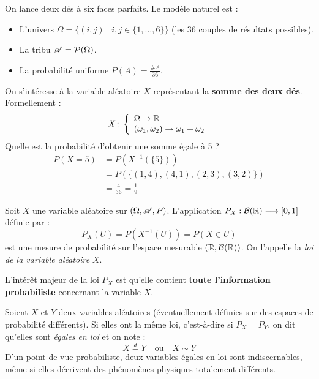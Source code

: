 \begin{exemple}
    On lance deux dés à six faces parfaits. Le modèle naturel est :
    \begin{itemize}
        \item L'univers $\Omega = \{(i,j) \mid i,j \in \{1,\dotsc,6\}\}$ (les 36 couples de résultats possibles).
        \item La tribu $\mathscr{A} = \mathcal{P}(\Omega)$.
        \item La probabilité uniforme $P(A) = \frac{\#A}{36}$.
    \end{itemize}
    On s'intéresse à la variable aléatoire $X$ représentant la \textbf{somme des deux dés}. Formellement :
    \[
    X\colon \left\{\begin{array}{l}\Omega\to\mathbb{R} \\(\omega_1, \omega_2) \to \omega_1 + \omega_2\end{array}\right.
    \]
    Quelle est la probabilité d'obtenir une somme égale à 5 ?
    \begin{align*}
        P(X = 5) &= P\!\left(X^{-1}(\{5\})\right) \\
        &= P\!\left(\{(1,4), (4,1), (2,3), (3,2)\}\right) \\
        &= \frac{4}{36} = \frac{1}{9}
    \end{align*}
\end{exemple}

\begin{definition}
    Soit $X$ une variable aléatoire sur $(\Omega, \mathscr{A}, P)$. L'application $P_X : \mathcal{B}(\mathbb{R}) \longrightarrow [0,1]$ définie par :
    \[
    P_X(U) = P\!\left(X^{-1}(U)\right) = P(X \in U)
    \]
    est une mesure de probabilité sur l'espace mesurable $(\mathbb{R}, \mathcal{B}(\mathbb{R}))$. On l'appelle la \emph{loi de la variable aléatoire} $X$.
\end{definition}

L'intérêt majeur de la loi $P_X$ est qu'elle contient \textbf{toute l'information probabiliste} concernant la variable $X$.

\begin{definition}
    Soient $X$ et $Y$ deux variables aléatoires (éventuellement définies sur des espaces de probabilité différents). Si elles ont la même loi, c'est-à-dire si $P_X = P_Y$, on dit qu'elles sont \emph{égales en loi} et on note :
    \[
    X \overset{d}{=} Y \quad \text{ou} \quad X \sim Y
    \]
    D'un point de vue probabiliste, deux variables égales en loi sont indiscernables, même si elles décrivent des phénomènes physiques totalement différents.
\end{definition}

